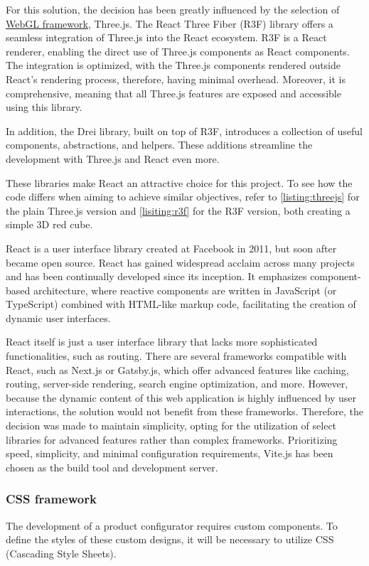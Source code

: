For this solution, the decision has been greatly influenced by the selection of \hyperref[section:WebGL]{WebGL framework}, Three.js. The React Three Fiber (R3F) library offers a seamless integration of Three.js into the React ecosystem. R3F is a React renderer, enabling the direct use of Three.js components as React components. The integration is optimized, with the Three.js components rendered outside React's rendering process, therefore, having minimal overhead. Moreover, it is comprehensive, meaning that all Three.js features are exposed and accessible using this library. \cite{R3F}

In addition, the Drei library, built on top of R3F, introduces a collection of useful components, abstractions, and helpers. These additions streamline the development with Three.js and React even more. \cite{Drei}

These libraries make React an attractive choice for this project. To see how the code differs when aiming to achieve similar objectives, refer to \autoref{listing:threejs} for the plain Three.js version and \autoref{lisiting:r3f} for the R3F version, both creating a simple 3D red cube.

React is a user interface library created at Facebook in 2011, but soon after became open source. React has gained widespread acclaim across many projects and has been continually developed since its inception. It emphasizes component-based architecture, where reactive components are written in JavaScript (or TypeScript) combined with HTML-like markup code, facilitating the creation of dynamic user interfaces. \cite{Banks2020}

React itself is just a user interface library that lacks more sophisticated functionalities, such as routing. There are several frameworks compatible with React, such as Next.js or Gatsby.js, which offer advanced features like caching, routing, server-side rendering, search engine optimization, and more. However, because the dynamic content of this web application is highly influenced by user interactions, the solution would not benefit from these frameworks. \cite{Eze2023} Therefore, the decision was made to maintain simplicity, opting for the utilization of select libraries for advanced features rather than complex frameworks. Prioritizing speed, simplicity, and minimal configuration requirements, Vite.js has been chosen as the build tool and development server. \cite{Said2023}


\subsubsection{CSS framework}
The development of a product configurator requires custom components. To define the styles of these custom designs, it will be necessary to utilize CSS (Cascading Style Sheets).

